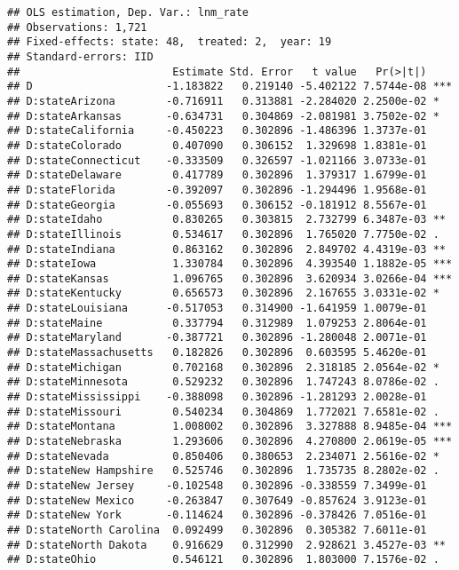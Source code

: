 \documentclass[
]{article}
\begin{document}
\begin{verbatim}
## OLS estimation, Dep. Var.: lnm_rate
## Observations: 1,721 
## Fixed-effects: state: 48,  treated: 2,  year: 19
## Standard-errors: IID 
##                        Estimate Std. Error   t value   Pr(>|t|)    
## D                     -1.183822   0.219140 -5.402122 7.5744e-08 ***
## D:stateArizona        -0.716911   0.313881 -2.284020 2.2500e-02 *  
## D:stateArkansas       -0.634731   0.304869 -2.081981 3.7502e-02 *  
## D:stateCalifornia     -0.450223   0.302896 -1.486396 1.3737e-01    
## D:stateColorado        0.407090   0.306152  1.329698 1.8381e-01    
## D:stateConnecticut    -0.333509   0.326597 -1.021166 3.0733e-01    
## D:stateDelaware        0.417789   0.302896  1.379317 1.6799e-01    
## D:stateFlorida        -0.392097   0.302896 -1.294496 1.9568e-01    
## D:stateGeorgia        -0.055693   0.306152 -0.181912 8.5567e-01    
## D:stateIdaho           0.830265   0.303815  2.732799 6.3487e-03 ** 
## D:stateIllinois        0.534617   0.302896  1.765020 7.7750e-02 .  
## D:stateIndiana         0.863162   0.302896  2.849702 4.4319e-03 ** 
## D:stateIowa            1.330784   0.302896  4.393540 1.1882e-05 ***
## D:stateKansas          1.096765   0.302896  3.620934 3.0266e-04 ***
## D:stateKentucky        0.656573   0.302896  2.167655 3.0331e-02 *  
## D:stateLouisiana      -0.517053   0.314900 -1.641959 1.0079e-01    
## D:stateMaine           0.337794   0.312989  1.079253 2.8064e-01    
## D:stateMaryland       -0.387721   0.302896 -1.280048 2.0071e-01    
## D:stateMassachusetts   0.182826   0.302896  0.603595 5.4620e-01    
## D:stateMichigan        0.702168   0.302896  2.318185 2.0564e-02 *  
## D:stateMinnesota       0.529232   0.302896  1.747243 8.0786e-02 .  
## D:stateMississippi    -0.388098   0.302896 -1.281293 2.0028e-01    
## D:stateMissouri        0.540234   0.304869  1.772021 7.6581e-02 .  
## D:stateMontana         1.008002   0.302896  3.327888 8.9485e-04 ***
## D:stateNebraska        1.293606   0.302896  4.270800 2.0619e-05 ***
## D:stateNevada          0.850406   0.380653  2.234071 2.5616e-02 *  
## D:stateNew Hampshire   0.525746   0.302896  1.735735 8.2802e-02 .  
## D:stateNew Jersey     -0.102548   0.302896 -0.338559 7.3499e-01    
## D:stateNew Mexico     -0.263847   0.307649 -0.857624 3.9123e-01    
## D:stateNew York       -0.114624   0.302896 -0.378426 7.0516e-01    
## D:stateNorth Carolina  0.092499   0.302896  0.305382 7.6011e-01    
## D:stateNorth Dakota    0.916629   0.312990  2.928621 3.4527e-03 ** 
## D:stateOhio            0.546121   0.302896  1.803000 7.1576e-02 .  

\end{verbatim}
\end{document}
